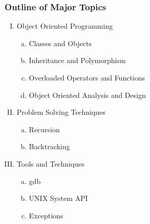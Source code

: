 \documentclass[handout]{beamer}
\begin{document}
\begin{frame}
   \frametitle{Outline of Major Topics}
   \begin{enumerate}[I.]
   \item Object Oriented Programming
       \begin{enumerate}[a.]
       \item Classes and Objects
       \item Inheritance and Polymorphism
       \item Overloaded Operators and Functions
       \item Object Oriented Analysis and Design
       \end{enumerate}
   \item Problem Solving Techniques
       \begin{enumerate}[a.]
       \item Recursion
       \item Backtracking
       \end{enumerate}
   \item Tools and Techniques
       \begin{enumerate}[a.]
       \item gdb 
       \item UNIX System API
       \item Exceptions
       \end{enumerate}
   \end{enumerate}
\end{frame}
\end{document}
